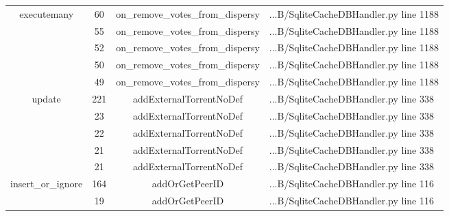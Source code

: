 \begin{table}[]
{\begin{tabular}{|c|c|c|l|}
		\multicolumn{1}{|c|}{\multirow{5}{*}{executemany}} & \multicolumn{1}{c|}{60} & \multicolumn{1}{c|}{on\_remove\_votes\_from\_dispersy} & \multicolumn{1}{l|}{...B/SqliteCacheDBHandler.py line 1188} \\ \cline{2-4}
		\multicolumn{1}{|c|}{} & \multicolumn{1}{c|}{55}  & \multicolumn{1}{c|}{on\_remove\_votes\_from\_dispersy}  & \multicolumn{1}{l|}{...B/SqliteCacheDBHandler.py line 1188}  \\ \cline{2-4} 
		\multicolumn{1}{|c|}{} & \multicolumn{1}{c|}{52}  & \multicolumn{1}{c|}{on\_remove\_votes\_from\_dispersy}  & \multicolumn{1}{l|}{...B/SqliteCacheDBHandler.py line 1188}  \\ \cline{2-4} 
		\multicolumn{1}{|c|}{} & \multicolumn{1}{c|}{50}  & \multicolumn{1}{c|}{on\_remove\_votes\_from\_dispersy}  & \multicolumn{1}{l|}{...B/SqliteCacheDBHandler.py line 1188}  \\ \cline{2-4} 
		\multicolumn{1}{|c|}{} & \multicolumn{1}{c|}{49}  & \multicolumn{1}{c|}{on\_remove\_votes\_from\_dispersy}  & \multicolumn{1}{l|}{...B/SqliteCacheDBHandler.py line 1188}  \\ \hline 
		\multicolumn{1}{|c|}{\multirow{5}{*}{update}} & \multicolumn{1}{c|}{221} & \multicolumn{1}{c|}{addExternalTorrentNoDef} & \multicolumn{1}{l|}{...B/SqliteCacheDBHandler.py line 338} \\ \cline{2-4}
		\multicolumn{1}{|c|}{} & \multicolumn{1}{c|}{23}  & \multicolumn{1}{c|}{addExternalTorrentNoDef}  & \multicolumn{1}{l|}{...B/SqliteCacheDBHandler.py line 338}  \\ \cline{2-4} 
		\multicolumn{1}{|c|}{} & \multicolumn{1}{c|}{22}  & \multicolumn{1}{c|}{addExternalTorrentNoDef}  & \multicolumn{1}{l|}{...B/SqliteCacheDBHandler.py line 338}  \\ \cline{2-4} 
		\multicolumn{1}{|c|}{} & \multicolumn{1}{c|}{21}  & \multicolumn{1}{c|}{addExternalTorrentNoDef}  & \multicolumn{1}{l|}{...B/SqliteCacheDBHandler.py line 338}  \\ \cline{2-4} 
		\multicolumn{1}{|c|}{} & \multicolumn{1}{c|}{21}  & \multicolumn{1}{c|}{addExternalTorrentNoDef}  & \multicolumn{1}{l|}{...B/SqliteCacheDBHandler.py line 338}  \\ \hline 
		\multicolumn{1}{|c|}{\multirow{5}{*}{insert\_or\_ignore}} & \multicolumn{1}{c|}{164} & \multicolumn{1}{c|}{addOrGetPeerID} & \multicolumn{1}{l|}{...B/SqliteCacheDBHandler.py line 116} \\ \cline{2-4}
		\multicolumn{1}{|c|}{} & \multicolumn{1}{c|}{19}  & \multicolumn{1}{c|}{addOrGetPeerID}  & \multicolumn{1}{l|}{...B/SqliteCacheDBHandler.py line 116}  \\ \cline{2-4} 

\end{tabular}}
\end{table}
